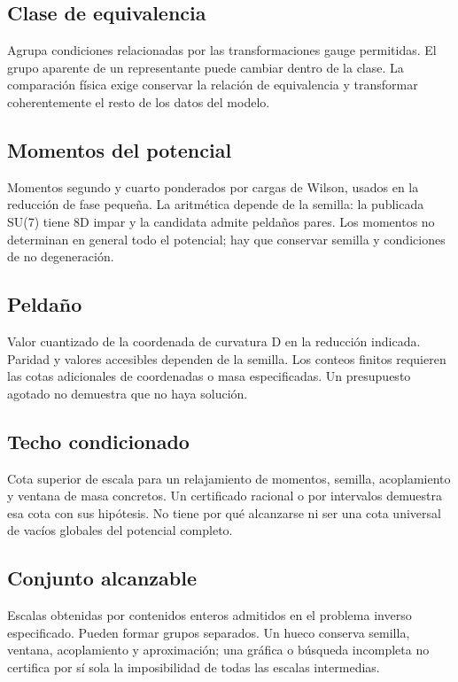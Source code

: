 \documentclass[11pt,a4paper]{article}
\begin{document}
\subsection*{Clase de equivalencia}
Agrupa condiciones relacionadas por las transformaciones gauge permitidas. El grupo aparente de un representante puede cambiar dentro de la clase. La comparación física exige conservar la relación de equivalencia y transformar coherentemente el resto de los datos del modelo.

\subsection*{Momentos del potencial}
Momentos segundo y cuarto ponderados por cargas de Wilson, usados en la reducción de fase pequeña. La aritmética depende de la semilla: la publicada SU(7) tiene 8D impar y la candidata admite peldaños pares. Los momentos no determinan en general todo el potencial; hay que conservar semilla y condiciones de no degeneración.

\subsection*{Peldaño}
Valor cuantizado de la coordenada de curvatura D en la reducción indicada. Paridad y valores accesibles dependen de la semilla. Los conteos finitos requieren las cotas adicionales de coordenadas o masa especificadas. Un presupuesto agotado no demuestra que no haya solución.

\subsection*{Techo condicionado}
Cota superior de escala para un relajamiento de momentos, semilla, acoplamiento y ventana de masa concretos. Un certificado racional o por intervalos demuestra esa cota con sus hipótesis. No tiene por qué alcanzarse ni ser una cota universal de vacíos globales del potencial completo.

\subsection*{Conjunto alcanzable}
Escalas obtenidas por contenidos enteros admitidos en el problema inverso especificado. Pueden formar grupos separados. Un hueco conserva semilla, ventana, acoplamiento y aproximación; una gráfica o búsqueda incompleta no certifica por sí sola la imposibilidad de todas las escalas intermedias.
\end{document}
